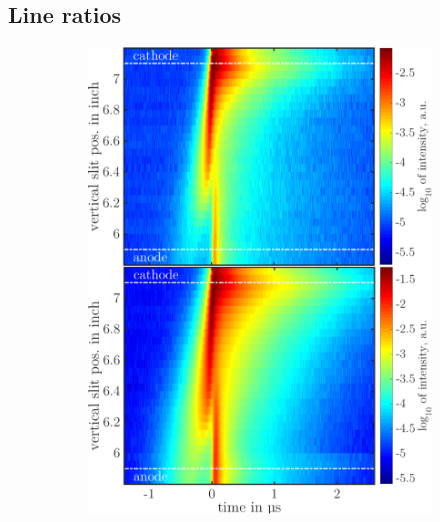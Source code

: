 \documentclass[a4paper,10pt,twoside]{article}
\begin{document}
		\subsection{Line ratios}
		
			\onecolumn
			
			\begin{figure}
				\centering
				\begin{subfigure}[t]{0.49\textwidth}
					\includegraphics[width=\textwidth]{figures/lineratio/667u706.pdf}
					\caption*{}
					\label{img:667u706nm}
				\end{subfigure}
				\hfill
				\begin{subfigure}[t]{0.49\textwidth}

\end{subfigure}
\end{figure}
\end{document}
